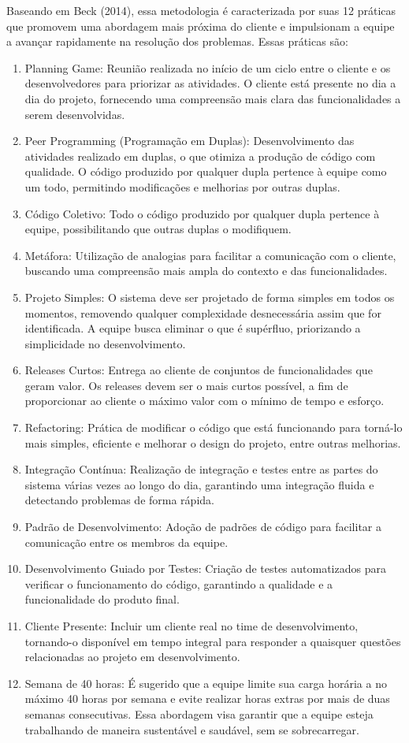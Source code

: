 Baseando em Beck (2014), essa metodologia é caracterizada por suas 12 práticas que promovem uma abordagem mais próxima do cliente e impulsionam a equipe a avançar rapidamente na resolução dos problemas. Essas práticas são:

\begin{enumerate}
	\item Planning Game: Reunião realizada no início de um ciclo entre o cliente e os desenvolvedores para priorizar as atividades. O cliente está presente no dia a dia do projeto, fornecendo uma compreensão mais clara das funcionalidades a serem desenvolvidas.
	\item Peer Programming (Programação em Duplas): Desenvolvimento das atividades realizado em duplas, o que otimiza a produção de código com qualidade. O código produzido por qualquer dupla pertence à equipe como um todo, permitindo modificações e melhorias por outras duplas.
	\item Código Coletivo: Todo o código produzido por qualquer dupla pertence à equipe, possibilitando que outras duplas o modifiquem.
	\item Metáfora: Utilização de analogias para facilitar a comunicação com o cliente, buscando uma compreensão mais ampla do contexto e das funcionalidades.
	\item Projeto Simples: O sistema deve ser projetado de forma simples em todos os momentos, removendo qualquer complexidade desnecessária assim que for identificada. A equipe busca eliminar o que é supérfluo, priorizando a simplicidade no desenvolvimento.
	\item Releases Curtos: Entrega ao cliente de conjuntos de funcionalidades que geram valor. Os releases devem ser o mais curtos possível, a fim de proporcionar ao cliente o máximo valor com o mínimo de tempo e esforço.
	\item Refactoring: Prática de modificar o código que está funcionando para torná-lo mais simples, eficiente e melhorar o design do projeto, entre outras melhorias.
	\item Integração Contínua: Realização de integração e testes entre as partes do sistema várias vezes ao longo do dia, garantindo uma integração fluida e detectando problemas de forma rápida.
	\item Padrão de Desenvolvimento: Adoção de padrões de código para facilitar a comunicação entre os membros da equipe.
	\item Desenvolvimento Guiado por Testes: Criação de testes automatizados para verificar o funcionamento do código, garantindo a qualidade e a funcionalidade do produto final.
	\item Cliente Presente: Incluir um cliente real no time de desenvolvimento, tornando-o disponível em tempo integral para responder a quaisquer questões relacionadas ao projeto em desenvolvimento.
	\item Semana de 40 horas: É sugerido que a equipe limite sua carga horária a no máximo 40 horas por semana e evite realizar horas extras por mais de duas semanas consecutivas. Essa abordagem visa garantir que a equipe esteja trabalhando de maneira sustentável e saudável, sem se sobrecarregar.

\end{enumerate}

